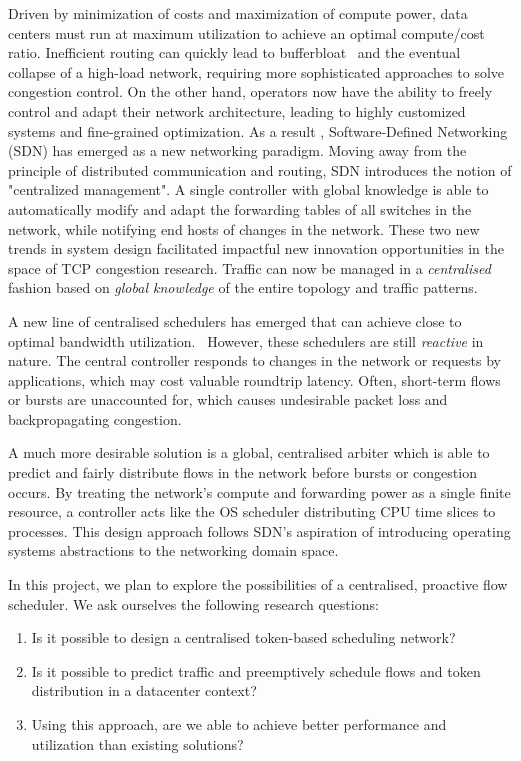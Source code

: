\documentclass[sigconf]{acmart}
\begin{document}
Driven by minimization of costs and maximization of compute power, data centers must  run at maximum utilization to achieve an optimal compute/cost ratio. Inefficient routing can quickly lead to bufferbloat~\cite{bufferbloat} and the eventual collapse of a high-load network, requiring more sophisticated approaches to solve congestion control. 
On the other hand, operators now have the ability to freely control and adapt their network architecture, leading to highly customized systems and fine-grained optimization. As a result , Software-Defined Networking (SDN) has emerged as a new networking paradigm. Moving away from the principle of distributed communication and routing, SDN introduces the notion of "centralized management". A single controller with global knowledge is able to automatically modify and adapt the forwarding tables of all switches in the network, while notifying end hosts of changes in the network.
These two new trends in system design facilitated impactful new innovation opportunities in the space of TCP congestion research. Traffic can now be managed in a  \textit{centralised} fashion based on \textit{global knowledge} of the entire topology and traffic patterns.

A new line of centralised schedulers has emerged that  can achieve close to optimal bandwidth utilization.~\cite{hedera, fastpass, microte, b4, dionysus}
However, these schedulers are still  \textit{reactive}  in nature. The central controller responds to changes in the network or requests by applications, which may cost valuable roundtrip latency. Often, short-term flows or bursts are unaccounted for, which causes undesirable packet loss and backpropagating congestion. 

A much more desirable solution is a global, centralised arbiter which is able to predict and fairly distribute flows in the network before bursts or congestion occurs. By treating the network’s compute and forwarding power as a single finite resource, a controller acts like the OS scheduler distributing CPU time slices to processes. This design approach follows SDN’s aspiration of introducing operating systems abstractions to the networking domain space.

In this project, we plan to explore the possibilities of a centralised, proactive flow scheduler. We ask ourselves the following research questions:
\begin{enumerate}
\item Is it possible to design a centralised token-based scheduling network?
\item Is it possible to predict traffic and preemptively schedule flows and token distribution in a datacenter context?
\item Using this approach, are we able to achieve better performance and utilization than existing solutions?
\end{enumerate}
\end{document}
